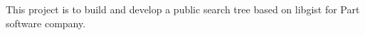 This project is to build and develop a public search tree based on libgist for Part software company. 